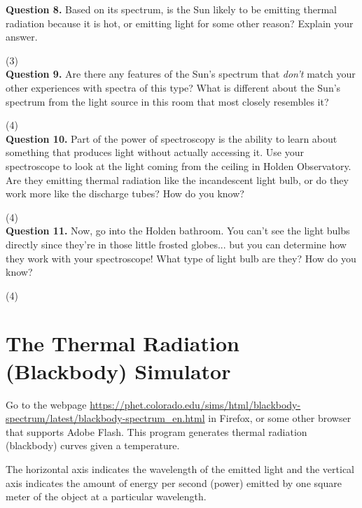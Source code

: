 \documentclass[11pt]{article}
\begin{document}
\textbf{Question 8.} Based on its spectrum, is the Sun likely to be emitting thermal radiation because it is hot, or emitting light for some other reason? Explain your answer.

\vspace{1.5cm}
(3) \hrulefill\\

\textbf{Question 9.} Are there any features of the Sun's spectrum that {\it don't} match your other experiences with spectra of this type? What is different about the Sun's spectrum from the light source in this room that most closely resembles it?

\vspace{2cm}
(4) \hrulefill\\

\textbf{Question 10.} Part of the power of spectroscopy is the ability to learn about something that produces light 
without actually accessing it. Use your spectroscope to look at the light coming from the ceiling in Holden Observatory.
Are they emitting thermal radiation like the incandescent light bulb, or do they work more like the discharge tubes? How do you know?

\vspace{2.5cm}
(4) \hrulefill\\

\textbf{Question 11.} Now, go into the Holden bathroom. You can't see the light bulbs directly since they're in those little frosted globes... but you can determine how they work with your spectroscope! What type of light bulb are they? How do you know?

\vspace{2cm}
(4) \hrulefill\\

\section{The Thermal Radiation (Blackbody) Simulator}

Go to the webpage \url {https://phet.colorado.edu/sims/html/blackbody-spectrum/latest/blackbody-spectrum_en.html} in Firefox, or some other browser that
supports Adobe Flash. This program generates thermal radiation (blackbody) curves given a temperature.

The horizontal axis indicates the wavelength of the emitted light and the vertical axis indicates the amount of energy per second (power) emitted by one square meter of the object at a particular wavelength.  
\end{document}
